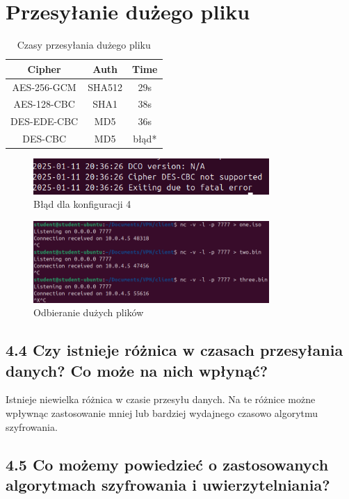 \documentclass{article}
\begin{document}
\section{Przesyłanie dużego pliku}
\begin{table}[H]
  \centering
  \begin{tabular}{|c|c|c|}
    \hline
    Cipher      & Auth   & Time  \\
    \hline
    AES-256-GCM & SHA512 & 29s   \\
    \hline
    AES-128-CBC & SHA1   & 38s   \\
    \hline
    DES-EDE-CBC & MD5    & 36s   \\
    \hline
    DES-CBC     & MD5    & błąd* \\
    \hline
  \end{tabular}
  \caption{Czasy przesyłania dużego pliku}
\end{table}

\begin{figure}[H]
  \centering
  \includegraphics[width=0.8\textwidth]{10_notsupported.png}
  \caption{Błąd dla konfiguracji 4}
\end{figure}

\begin{figure}[H]
  \centering
  \includegraphics[width=0.8\textwidth]{recieved files.png}
  \caption{Odbieranie dużych plików}
\end{figure}
\subsection*{4.4 Czy istnieje różnica w czasach przesyłania danych? Co może na nich wpłynąć?}
Istnieje niewielka różnica w czasie przesyłu danych. Na te różnice możne wpływnąc zastosowanie mniej lub bardziej wydajnego czasowo algorytmu szyfrowania.
\subsection*{4.5 Co możemy powiedzieć o zastosowanych algorytmach szyfrowania i
  uwierzytelniania?}
\end{document}
